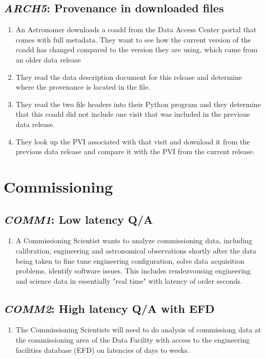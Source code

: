 \documentclass[DM,toc,lsstdraft]{lsstdoc}
\newcommand{\usecase}[3]{%
\subsection{\emph{#1}: #2}
\label{use:#1}
\begin{enumerate}[label=\alph*.]
#3
\end{enumerate}
}
\begin{document}
\usecase{ARCH5}{Provenance in downloaded files}{%

\item
An Astronomer downloads a coadd from the Data Access Center portal that comes with full metadata.
They want to see how the current version of the coadd has changed compared to the version they are using, which came from an older data release

\item
They read the data description document for this release and determine where the provenance is located in the file.

\item
They read the two file headers into their Python program and they determine that this coadd did not include one visit that was included in the previous data release.

\item
They look up the PVI associated with that visit and download it from the previous data release and compare it with the PVI from the current release.

}

\section{Commissioning}

\usecase{COMM1}{Low latency Q/A}{%

\item
A Commissioning Scientist wants to analyze commissioning data, including calibration, engineering and astronomical observations shortly after the data being taken to fine tune engineering configuration, solve data acquisition problems, identify software issues.
This includes rendezvousing engineering and science data in essentially "real time" with latency of order seconds.

}

\usecase{COMM2}{High latency Q/A with EFD}{%

\item
The Commissioning Scientists will need to do analysis of commissiong data at the commissioning area of the Data Facility with access to the engineering facilities database (EFD) on latencies of days to weeks.

}
\end{document}
